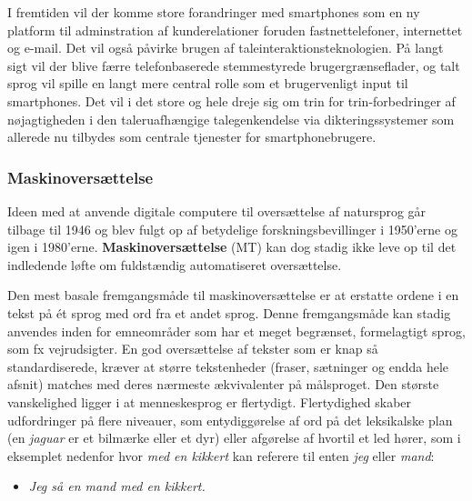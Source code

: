 \begin{multicols}{2}
I fremtiden vil der komme store forandringer med smartphones som en ny platform til adminstration af kunderelationer foruden fastnettelefoner, internettet og e-mail. Det vil \mbox{ogs\aa} p\aa virke brugen af taleinteraktionsteknologien. \mbox{P\aa} langt sigt vil der blive f\ae rre telefonbaserede stemmestyrede brugergr\ae nseflader, og talt sprog vil spille en langt mere central rolle som et brugervenligt input til smartphones. Det vil i det store og hele dreje sig om trin for trin-forbedringer af n\o jagtigheden i den taleruafh\ae ngige talegenkendelse via dikteringssystemer som allerede nu tilbydes som centrale tjenester for smartphonebrugere.

\subsubsection{Maskinovers\ae ttelse}

Ideen med at anvende digitale computere til overs\ae ttelse af natursprog g\aa r tilbage til 1946 og blev fulgt op af betydelige forskningsbevillinger i 1950'erne og igen i 1980'erne. {\bf Maskinovers\ae ttelse} (MT) kan dog stadig ikke leve op til det indledende l\o fte om fuldst\ae ndig automatiseret overs\ae ttelse.


Den mest basale fremgangsm\aa de til maskinovers\ae ttelse er at erstatte ordene i en tekst \mbox{p\aa} \'{e}t  sprog med ord fra et andet sprog. Denne fremgangsm\aa de kan stadig anvendes inden for emneomr\aa der som har et meget begr\ae nset, formelagtigt sprog, som fx vejrudsigter. En god overs\ae ttelse af tekster som er knap \mbox{s\aa} standardiserede, kr\ae ver at st\o rre tekstenheder (fraser, s\ae tninger og endda hele afsnit) matches med deres n\ae rmeste \ae kvivalenter \mbox{p\aa} m\aa lsproget. Den st\o rste vanskelighed ligger i at menneskesprog er flertydigt. Flertydighed skaber udfordringer \mbox{p\aa} flere niveauer, som entydigg\o relse af ord \mbox{p\aa} det leksikalske plan (en {\it jaguar} er et bilm\ae rke eller et dyr) eller afg\o relse af hvortil et led h\o rer, som i eksemplet nedenfor hvor {\it med en kikkert} kan referere til enten {\it jeg} eller {\it mand}:

\begin{itemize}
\item {\it Jeg \mbox{s\aa} en mand med en kikkert.}
\end{itemize}


\end{multicols}

